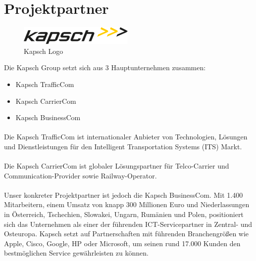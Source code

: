 \newpage

\section{Projektpartner}
\begin{figure}[H]
\includegraphics[scale=1.0]{Images/kapsch_logo}
\caption{Kapsch Logo}
\end{figure}
Die Kapsch Group setzt sich aus 3 Hauptunternehmen zusammen:
\begin{itemize}
	\item Kapsch TrafficCom
	\item Kapsch CarrierCom
	\item Kapsch BusinessCom
\end{itemize}

\paragraph*{}
Die Kapsch TrafficCom ist internationaler Anbieter von Technologien, Lösungen und Dienstleistungen für den Intelligent Transportation Systems (ITS) Markt. 
\paragraph*{}
Die Kapsch CarrierCom ist globaler Lösungspartner für Telco-Carrier und Communication-Provider sowie Railway-Operator. 
\paragraph*{} 
Unser konkreter Projektpartner ist jedoch die Kapsch BusinessCom.
Mit 1.400 Mitarbeitern, einem Umsatz von knapp 300 Millionen Euro und Niederlassungen in Österreich, Tschechien, Slowakei, Ungarn, Rumänien und Polen, positioniert sich das Unternehmen als einer der führenden ICT-Servicepartner in Zentral- und Osteuropa. Kapsch setzt auf Partnerschaften mit führenden Branchengrößen wie Apple, Cisco, Google, HP oder Microsoft, um seinen rund 17.000 Kunden den bestmöglichen Service gewährleisten zu können.

\newpage

